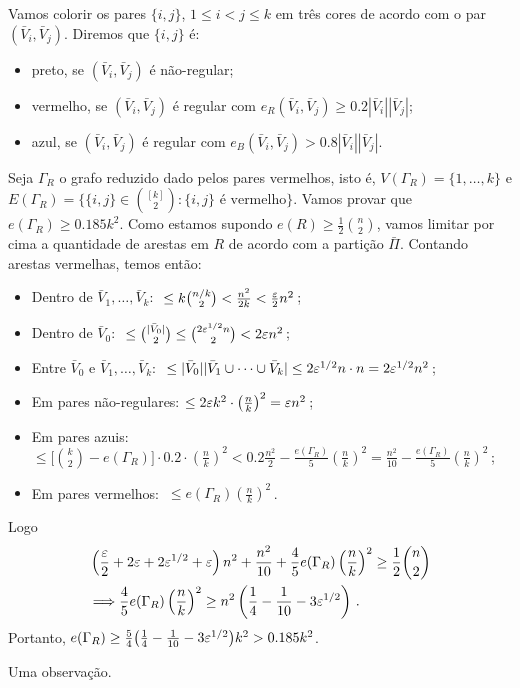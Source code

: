 Vamos colorir os pares $\{i,j\}$, $1\leq i<j\leq k$ em três cores de acordo com o par $(\bar{V}_i, \bar{V}_j)$. Diremos que $\{i, j\}$ é:
\begin{itemize}
	\item preto, se $(\bar{V}_i, \bar{V}_j)$ é não-regular;
	\item vermelho, se $(\bar{V}_i, \bar{V}_j)$ é regular com $e_R(\bar{V}_i, \bar{V}_j)\geq 0.2|\bar{V}_i||\bar{V}_j|$;
	\item azul, se $(\bar{V}_i, \bar{V}_j)$ é regular com $e_B(\bar{V}_i, \bar{V}_j)>0.8|\bar{V}_i||\bar{V}_j|$.
\end{itemize}

Seja $\Gamma_R$ o grafo reduzido dado pelos pares vermelhos, isto é, $V(\Gamma_R) = \{1,\dots, k\}$ e $E(\Gamma_R) = \{\{i,j\}\in \binom{[k]}{2}: \{i,j\} \text{ é vermelho}\}$. Vamos provar que $e(\Gamma_R)\geq0.185k^2$.
Como estamos supondo $e(R)\geq \frac{1}{2}\binom{n}{2}$, vamos limitar por cima a quantidade de arestas em $R$ de acordo com a partição $\bar{\Pi}$. Contando arestas vermelhas, temos então:
\begin{itemize}
	\item[] Dentro de $\bar{V}_1, \dots, \bar{V}_k$: $~\leq k \binom{n/k}{2} < \frac{n^2}{2k} < \frac{\varepsilon}{2}n^2$\,;
	\item[] Dentro de $\bar{V}_0$: $~\leq \binom{|\bar{V}_0|}{2}\leq \binom{2\varepsilon^{1/2}n}{2} < 2\varepsilon n^2$\,;
	\item[] Entre $\bar{V}_0$ e $\bar{V}_1,\dots, \bar{V}_k$: $~\leq |\bar{V}_0||\bar{V}_1\cup\dots\cup \bar{V}_k| \leq 2\varepsilon^{1/2}n\cdot n = 2\varepsilon^{1/2}n^2$\,;
	\item[] Em pares não-regulares: $\leq 2\varepsilon k^2\cdot \left(\frac{n}{k}\right)^2 = \varepsilon n^2$\,;
	\item[] Em pares azuis: $\leq \big[\binom{k}{2} - e(\Gamma_R)\big]\cdot 0.2 \cdot \left(\frac{n}{k}\right)^2 < 0.2\frac{n^2}{2} - \frac{e(\Gamma_R)}{5}\left(\frac{n}{k}\right)^2 = \frac{n^2}{10} - \frac{e(\Gamma_R)}{5}\left(\frac{n}{k}\right)^2$\,;
	\item[] Em pares vermelhos: $~\leq e(\Gamma_R)\left(\frac{n}{k}\right)^2$\,.
\end{itemize}
Logo 
\begin{align*}
	&\left(\frac{\varepsilon}{2} + 2\varepsilon + 2\varepsilon^{1/2} + \varepsilon\right)n^2 + \frac{n^2}{10} + \frac{4}{5}e(\Gamma_R)\left(\frac{n}{k}\right)^2\geq \frac{1}{2}\binom{n}{2}\\
	&\Longrightarrow  \frac{4}{5}e(\Gamma_R)\left(\frac{n}{k}\right)^2\geq n^2\left(\frac{1}{4} - \frac{1}{10} - 3\varepsilon^{1/2}\right)\,.
\end{align*}
Portanto, $e(\Gamma_R)\geq \frac{5}{4}\big(\frac{1}{4} - \frac{1}{10} - 3\varepsilon^{1/2}\big)k^2 > 0.185k^2$.
\begin{obs}
  Uma observação.
\end{obs}

